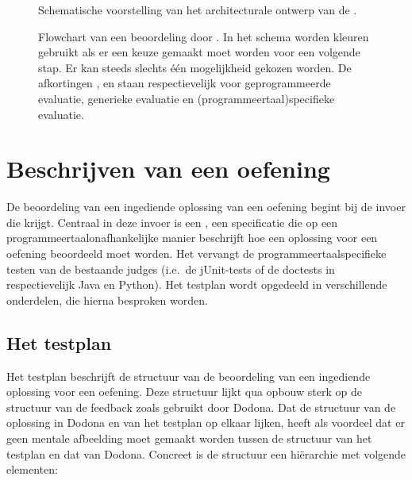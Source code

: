 \begin{figure}
    \centering
    
    \caption{Schematische voorstelling van het architecturale ontwerp van de \tested{}.}
    \label{fig:universal-judge}
\end{figure}

\begin{figure}
    \centering
    
    \caption{
        Flowchart van een beoordeling door \tested{}.
        In het schema worden kleuren gebruikt als er een keuze gemaakt moet worden voor een volgende stap.
        Er kan steeds slechts één mogelijkheid gekozen worden.
        De afkortingen ,  en  staan respectievelijk voor geprogrammeerde evaluatie, generieke evaluatie en (programmeertaal)specifieke evaluatie.
    }
    \label{fig:tested-flow}
\end{figure}


\section{Beschrijven van een oefening}\label{sec:testplan}

De beoordeling van een ingediende oplossing van een oefening begint bij de invoer die \tested{} krijgt.
Centraal in deze invoer is een , een specificatie die op een programmeertaalonafhankelijke manier beschrijft hoe een oplossing voor een oefening beoordeeld moet worden.
Het vervangt de programmeertaalspecifieke testen van de bestaande judges (i.e.\ de jUnit-tests of de doctests in respectievelijk Java en Python).
Het testplan  wordt opgedeeld in verschillende onderdelen, die hierna besproken worden.

\subsection{Het testplan}\label{subsec:het-testplan}

Het testplan  beschrijft de structuur van de beoordeling van een ingediende oplossing voor een oefening.
Deze structuur lijkt qua opbouw sterk op de structuur van de feedback zoals gebruikt door Dodona.
Dat de structuur van de oplossing in Dodona en van het testplan op elkaar lijken, heeft als voordeel dat er geen mentale afbeelding moet gemaakt worden tussen de structuur van het testplan en dat van Dodona.
Concreet is de structuur een hiërarchie met volgende elementen:

